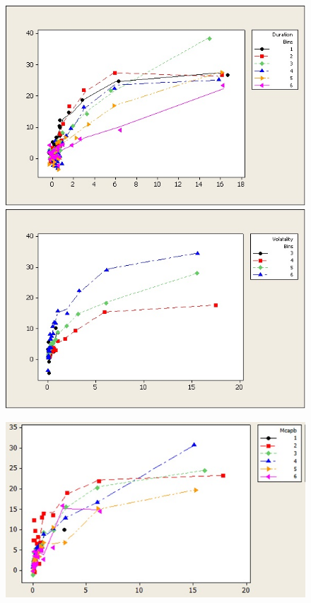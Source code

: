     \begin{figure}[!ht]
        \begin{minipage}[b]{0.45\linewidth}
            \centering
            \includegraphics[width=\textwidth]{chapters/chapter_mi_models/figures/fig4.jpg}
            \includegraphics[width=\textwidth]{chapters/chapter_mi_models/figures/fig5.jpg}
        \end{minipage}
        \hspace{0.5cm}
        \begin{minipage}[b]{0.45\linewidth}
            \centering
            \includegraphics[width=1.05\textwidth]{chapters/chapter_mi_models/figures/fig6.jpg}

\end{minipage}
\end{figure}
